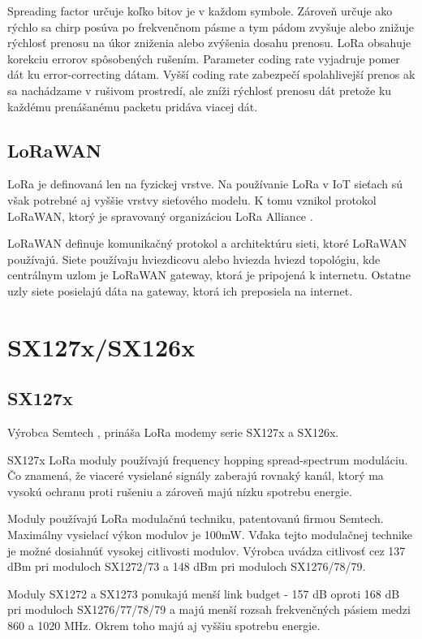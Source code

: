 \documentclass[czech,master]{diploma}
\begin{document}
Spreading factor určuje koľko bitov je v každom symbole. Zároveň určuje ako rýchlo sa chirp posúva po frekvenčnom pásme a tym pádom zvyšuje alebo znižuje rýchlosť 
prenosu na úkor zniženia alebo zvýšenia dosahu prenosu.
LoRa obsahuje korekciu errorov spôsobených rušením. Parameter coding rate vyjadruje pomer dát ku error-correcting dátam. Vyšší coding rate zabezpečí spolahlivejší prenos ak 
sa nachádzame v rušivom prostredí, ale zníži rýchlosť prenosu dát pretože ku každému prenášanému packetu pridáva viacej dát.

\subsection{LoRaWAN}
LoRa je definovaná len na fyzickej vrstve. Na používanie LoRa v IoT sieťach sú však potrebné aj vyššie vrstvy sieťového modelu.
K tomu vznikol protokol LoRaWAN, ktorý je spravovaný organizáciou LoRa Alliance \cite{lora}.

LoRaWAN definuje komunikačný protokol a architektúru sieti, ktoré LoRaWAN používajú. Siete používaju hviezdicovu alebo hviezda hviezd topológiu, kde 
centrálnym uzlom je LoRaWAN gateway, ktorá je pripojená k internetu. Ostatne uzly siete posielajú dáta na gateway, ktorá ich preposiela na internet.


\section{SX127x/SX126x}
\subsection{SX127x}
Výrobca Semtech \cite{semtech}, prináša LoRa modemy serie SX127x a SX126x. 

SX127x LoRa moduly používajú frequency hopping spread-spectrum moduláciu. Čo znamená, že viaceré vysielané signály zaberajú rovnaký kanál, ktorý ma 
vysokú ochranu proti rušeniu a zároveň majú nízku spotrebu energie.

Moduly používajú LoRa modulačnú techniku, patentovanú firmou Semtech. Maximálny vysielací výkon modulov je 100mW. %
Vďaka tejto modulačnej technike je možné dosiahnúť vysokej citlivosti modulov.
Výrobca uvádza citlivosť cez 137 dBm pri moduloch SX1272/73 a 148 dBm pri moduloch SX1276/78/79.

Moduly SX1272 a SX1273 ponukajú menší link budget - 157 dB oproti 168 dB pri moduloch SX1276/77/78/79 a majú menší rozsah frekvenčných pásiem medzi 860 a 1020 MHz.
Okrem toho majú aj vyššiu spotrebu energie.
\end{document}
